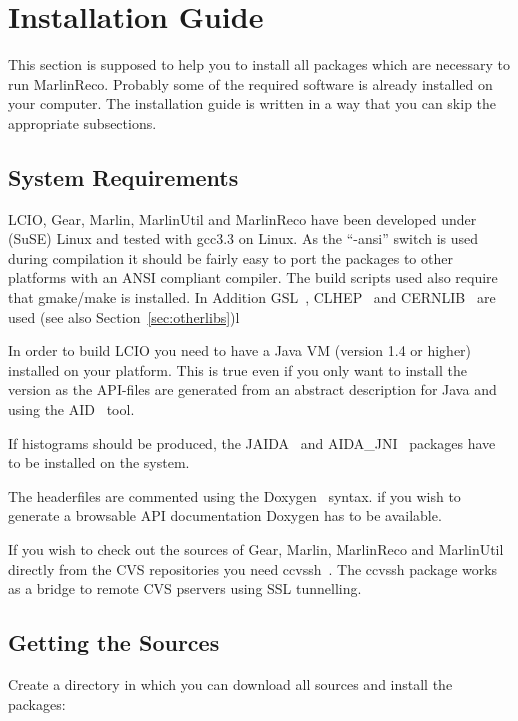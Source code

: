 \section{Installation Guide} \label{sec:install}

This section is supposed to help you to install all packages which are 
necessary to run MarlinReco. Probably some of the required software is 
already installed on your computer. The installation guide is written 
in a way that you can skip the appropriate subsections. 

\subsection{System Requirements}

LCIO, Gear, Marlin, MarlinUtil and MarlinReco have been 
developed under (SuSE) Linux and tested with gcc3.3 on Linux. 
As the ``-ansi'' switch is used during compilation
it should be fairly easy to 
port the packages to other platforms with an ANSI compliant \CPP{} compiler.
The build scripts used also require that gmake/make is installed.
In Addition GSL~\cite{ref_gsl}, CLHEP~\cite{ref_clhep} and 
CERNLIB~\cite{ref_cernlib} are used (see also Section~\ref{sec:otherlibs})l

In order to build LCIO you need to have a Java VM (version 1.4 or
higher) installed on your platform. This is true even if you only want
to install the \CPP{} version as the API-files are generated from an
abstract description for Java and \CPP{} using the AID~\cite{ref_aid} tool.

If histograms should be produced, the JAIDA~\cite{ref_jaida} and 
AIDA\_JNI~\cite{ref_aidajni} packages have 
to be installed on the system. 

The headerfiles are commented using the Doxygen~\cite{ref_doxygen} syntax. 
if you wish to generate a browsable API documentation Doxygen 
has to be available.

If you wish to check out the sources of Gear, Marlin, MarlinReco
and MarlinUtil directly from the CVS repositories you need
ccvssh~\cite{ref_ccvssh}.
The ccvssh package works as a bridge to remote CVS
pservers using SSL tunnelling.  

\subsection{Getting the Sources}

Create a directory in which you can download all sources and install 
the packages:

